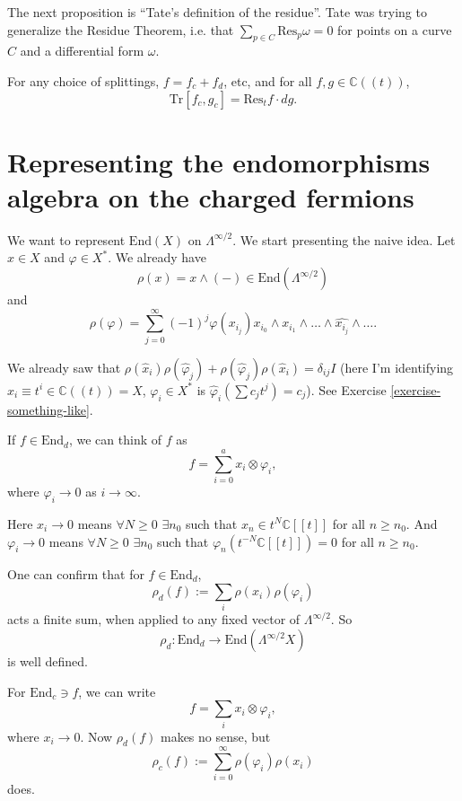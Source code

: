 \noindent
The next proposition is
``Tate's definition of the residue''.
Tate was trying to generalize the Residue Theorem,
i.e. that $\sum_{p \in C}\text{Res}_p \omega=0$ 
for points on a curve $C$ and a differential form $\omega$.

\begin{proposition}
\label{proposition-trace}
For any choice of splittings,
$f=f_c+f_d$, etc, and for all $f,g \in \mathbb{C}((t))$,
$$
\text{Tr}[f_c,g_c]=\text{Res}_tf\cdot dg.
$$
\end{proposition}

\section{Representing the endomorphisms algebra on the charged fermions}
\label{section-end-rep-fermions}

We want to represent $\text{End}(X)$ on $ \Lambda^{\infty/2}$.
We start presenting the naive idea.
Let $x \in X$ and $\varphi \in X^*$.
We already have
$$
\rho(x)=x \wedge(-) \in \text{End}(\Lambda^{\infty/2})
$$
and
$$
\rho(\varphi)=\sum_{j=0}^\infty(-1)^j
\varphi(x_{i_j})x_{i_0}\wedge x_{i_1}\wedge\ldots\wedge \widehat{x_{i_j}}
\wedge \ldots.
$$

\noindent
We already saw that
$\rho(\hat{x}_i)\rho(\hat{\varphi}_j)+\rho(\hat{\varphi}_j)\rho(\hat{x}_i)
=\delta_{ij}I$
(here I'm identifying
$\hat{x}_i \equiv t^i \in \mathbb{C}((t))=X$,
 $\varphi_i \in X^*$ is
$\hat{\varphi}_i (\sum c_jt^j)=c_j$).
See Exercise \ref{exercise-something-like}.

If $f \in \text{End}_d$, we can think of $f$ as
$$
f=\sum_{i=0}^a x_i \otimes \varphi_i,
$$
where $\varphi_i\to 0$ as $i \to \infty$.

Here $x_i \to 0$ means
$\forall  N \geq 0$ $\exists n_0$ such that
$x_n \in t^N \mathbb{C}[[t]]$ for all $n\geq  n_0$.
And $\varphi_i \to 0$ means $\forall  N \geq 0$ $\exists n_0$
such that
$\varphi_n(t^{-N}\mathbb{C}[[t]])=0$ for all $n\geq n_0$.

One can confirm that for $f \in \text{End}_d$,
$$
\rho_d(f):=\sum_i\rho(x_i)\rho(\varphi_i)
$$
acts a finite sum,
when applied to any fixed vector of
$\Lambda^{\infty/2}$.
So
$$
\rho_d:\text{End}_d \to \text{End}(\Lambda^{\infty/2}X)
$$
is well defined.

For  $\text{End}_c \ni f$, we can write
$$
f=\sum_i x_i \otimes \varphi_i,
$$
where $x_i \to 0$.
Now $\rho_d(f)$ makes no sense, but
$$
\rho_c(f):=\sum_{i=0}^\infty\rho(\varphi_i)\rho(x_i)
$$
does.

